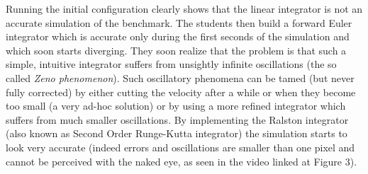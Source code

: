 Running the initial configuration clearly shows that the linear integrator is not an accurate simulation of the benchmark. The students then build a forward Euler integrator which is accurate only during the first seconds of the simulation and which soon starts diverging. They soon realize that the problem is that such a simple, intuitive integrator suffers from unsightly infinite oscillations (the so called \textit{Zeno phenomenon}). Such oscillatory phenomena can be tamed (but never fully corrected) by either cutting the velocity after a while or when they become too small (a very ad-hoc solution) or by using a more refined integrator which suffers from much smaller oscillations. By implementing the Ralston integrator (also known as Second Order Runge-Kutta integrator) the simulation starts to look very accurate (indeed errors and oscillations are smaller than one pixel and cannot be perceived with the naked eye, as seen in the video linked at Figure 3).
